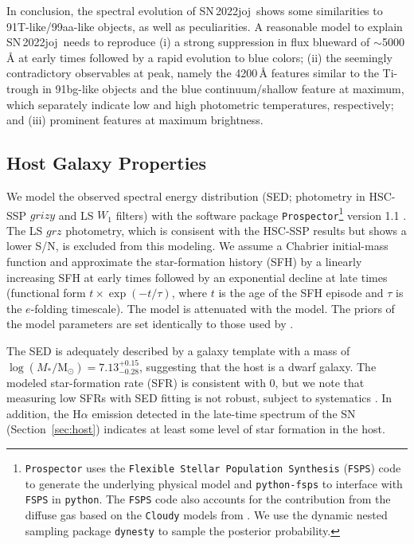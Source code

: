 \documentclass[twocolumn]{aastex631}
\newcommand{\sn}{SN\,2022joj}
\begin{document}
\begin{CJK*}{UTF8}{gbsn}
In conclusion, the spectral evolution of \sn\ shows some similarities to 91T-like/99aa-like objects, as well as peculiarities. A reasonable model to explain \sn\ needs to reproduce (i) a strong suppression in flux blueward of $\sim$5000\,\r{A} at early times followed by a rapid evolution to blue colors; (ii) the seemingly contradictory observables at peak, namely the 4200\,\r{A} features similar to the Ti-trough in 91bg-like objects and the blue continuum/shallow  feature at maximum, which separately indicate low and high photometric temperatures, respectively; and (iii) prominent  features at maximum brightness. 



\subsection{Host Galaxy Properties}
We model the observed spectral energy distribution (SED; photometry in HSC-SSP $grizy$ and LS $W_1$ filters) with the software package \texttt{Prospector}\footnote{\texttt{Prospector} uses the \texttt{Flexible Stellar Population Synthesis} (\texttt{FSPS}) code \citep{Conroy_2009} to generate the underlying physical model and \texttt{python-fsps} \citep{ForemanMackey_FSPS_2014} to interface with \texttt{FSPS} in \texttt{python}. The \texttt{FSPS} code also accounts for the contribution from the diffuse gas based on the \texttt{Cloudy} models from \citet{Byler2017a}. We use the dynamic nested sampling package \texttt{dynesty} \citep{Speagle_dynesty_2020} to sample the posterior probability.} version 1.1 \citep{Johnson_prospector_2021}. The LS $grz$ photometry, which is consisent with the HSC-SSP results but shows a lower S/N, is excluded from this modeling. We assume a Chabrier initial-mass function \citep[IMF;][]{Chabrier2003a} and approximate the star-formation history (SFH) by a linearly increasing SFH at early times followed by an exponential decline at late times (functional form $t \times \exp\left(-t/\tau\right)$, where $t$ is the age of the SFH episode and $\tau$ is the $e$-folding timescale). The model is attenuated with the \citet{Calzetti2000a} model. The priors of the model parameters are set identically to those used by \citet{Schulze2021a}. 

The SED is adequately described by a galaxy template with a mass of $\log(M_*/\mathrm{M_\odot}) = 7.13^{+0.15}_{-0.28}$, suggesting that the host is a dwarf galaxy. The modeled star-formation rate (SFR) is consistent with 0, but we note that measuring low SFRs with SED fitting is not robust, subject to systematics \citep{Conroy_2013}. In addition, the H$\alpha$ emission detected in the late-time spectrum of the SN (Section~\ref{sec:host}) indicates at least some level of star formation in the host.


\end{CJK*}
\end{document}
